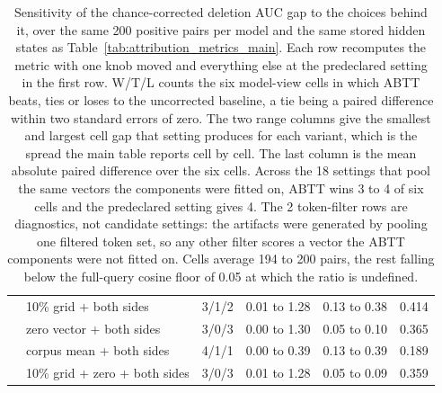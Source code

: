 \begin{table}[t]
\begin{tabular}{llcccc}
 & 10\% grid + both sides & 3/1/2 & 0.01 to 1.28 & 0.13 to 0.38 & 0.414 \\
 & zero vector + both sides & 3/0/3 & 0.00 to 1.30 & 0.05 to 0.10 & 0.365 \\
 & corpus mean + both sides & 4/1/1 & 0.00 to 0.39 & 0.13 to 0.39 & 0.189 \\
 & 10\% grid + zero + both sides & 3/0/3 & 0.01 to 1.28 & 0.05 to 0.09 & 0.359 \\
\bottomrule
\end{tabular}
\caption{Sensitivity of the chance-corrected deletion AUC gap to the choices behind it, over the same 200 positive pairs per model and the same stored hidden states as Table~\ref{tab:attribution_metrics_main}. Each row recomputes the metric with one knob moved and everything else at the predeclared setting in the first row. W/T/L counts the six model-view cells in which ABTT beats, ties or loses to the uncorrected baseline, a tie being a paired difference within two standard errors of zero. The two range columns give the smallest and largest cell gap that setting produces for each variant, which is the spread the main table reports cell by cell. The last column is the mean absolute paired difference over the six cells. Across the 18 settings that pool the same vectors the components were fitted on, ABTT wins 3 to 4 of six cells and the predeclared setting gives 4. The 2 token-filter rows are diagnostics, not candidate settings: the artifacts were generated by pooling one filtered token set, so any other filter scores a vector the ABTT components were not fitted on. Cells average 194 to 200 pairs, the rest falling below the full-query cosine floor of 0.05 at which the ratio is undefined.}
\label{tab:attribution_delauc_sensitivity}
\end{table}
